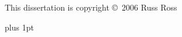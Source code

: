 \vfill

\noindent This dissertation is copyright \copyright~2006 Russ Ross

\cleardoublepage



\pagestyle{plain}
\enlargethispage*{60cm}        %

{}
\cleardoublepage

%

%        
%


%

{
  \parskip 0pt plus 1pt
  \tableofcontents
}

\cleardoublepage

%

% 

%

% 

%

% 

%

%  

